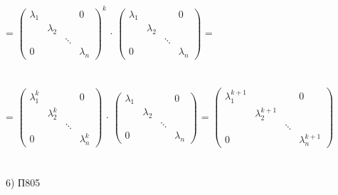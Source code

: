 \documentclass[12pt, a4paper]{article}
\begin{document}
	=
	\begin{math}
		\left(
		\begin{array}{rrrr}
			\lambda_1 &  &  & 0 \\
			& \lambda_2 &  &  \\
			& & \ddots &\\
			0 & & & \lambda_n
		\end{array} 
		\right ) ^k
	\end{math}
	$\cdot$
	\begin{math}
		\left(
		\begin{array}{rrrr}
			\lambda_1 &  &  & 0 \\
			& \lambda_2 &  &  \\
			& & \ddots &\\
			0 & & & \lambda_n
		\end{array} 
		\right )
	\end{math}
	=\\\\\\
	=
	\begin{math}
		\left(
		\begin{array}{rrrr}
			\lambda_1^k &  &  & 0 \\
			& \lambda_2^k &  &  \\
			& & \ddots &\\
			0 & & & \lambda_n^k
		\end{array} 
		\right )
	\end{math}
	$\cdot$
	\begin{math}
		\left(
		\begin{array}{rrrr}
			\lambda_1 &  &  & 0 \\
			& \lambda_2 &  &  \\
			& & \ddots &\\
			0 & & & \lambda_n
		\end{array} 
		\right )
	\end{math}
	=
	\begin{math}
		\left(
		\begin{array}{rrrr}
			\lambda_1^{k+1} &  &  & 0 \\
			& \lambda_2^{k+1} &  &  \\
			& & \ddots &\\
			0 & & & \lambda_n^{k+1}
		\end{array} 
		\right )
	\end{math}
	\\\\\\
	6) П805\\\\\\
\end{document}
